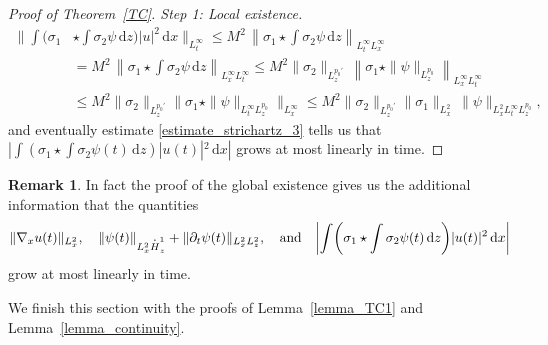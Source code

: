 \documentclass[11pt]{article}
\DeclareRobustCommand{\accentset}[2]{\overset{#1}{#2}}
\theoremstyle{definition}
\newtheorem{rmk}[lemma]{Remark}
\newcommand*{\overbigdot}[1]{%
\accentset{\mbox{\large\bfseries .}}{#1}}
\newenvironment{ProofOf}[1]{\begin{proof}[Proof of #1]}{\end{proof}}
\newcommand{\ud}{\, {\mathrm{d}}}
\begin{document}
\begin{ProofOf}{Theorem~\ref{TC}. Step 1: Local existence}
\begin{equation}
\begin{split}
\biggl\|\int(\sigma_{1}&\star\int\sigma_{2}\psi\ud z)|u|^{2}\ud x\biggr\|_{L_{t}^{\infty}}\leq M^{2}\,\left\|\sigma_{1}\star\int\sigma_{2}\psi\ud z\right\|_{L_{t}^{\infty}L_{x}^{\infty}}\\
&=M^{2}\,\left\|\sigma_{1}\star\int\sigma_{2}\psi\ud z\right\|_{L_{x}^{\infty}L_{t}^{\infty}}\leq M^{2}\|\sigma_{2}\|_{L_{z}^{p_{0}'}}\,\left\|\sigma_{1}\star\|\psi\|_{L_{z}^{p_{0}}}\right\|_{L_{x}^{\infty}L_{t}^{\infty}}\\
&\leq M^{2}\|\sigma_{2}\|_{L_{z}^{p_{0}'}}\bigl\|\sigma_{1}\star\|\psi\|_{L_{t}^{\infty}L_{z}^{p_{0}}}\bigr\|_{L_{x}^{\infty}}\leq M^{2}\|\sigma_{2}\|_{L_{z}^{p_{0}'}}\|\sigma_{1}\|_{L_{x}^{2}}\,\|\psi\|_{L_{x}^{2}L_{t}^{\infty}L_{z}^{p_{0}}},
\end{split}
\end{equation}
and eventually estimate \eqref{estimate_strichartz_3} tells us that $|\int(\sigma_{1}\star\int\sigma_{2}\psi(t)\ud z)|u(t)|^{2}\ud x|$ grows at most linearly in time.
\end{ProofOf}

\begin{rmk}
In fact the proof of the global existence gives us the additional information that the quantities
\[
\|\nabla_{x}u(t)\|_{L_{x}^{2}},\quad \|\psi(t)\|_{L_{x}^{2}\overbigdot{H}_{z}^{1}}+\|\partial_{t}\psi(t)\|_{L_{x}^{2}L_{z}^{2}},\quad\text{and}\quad
\biggl|\int\biggl(\sigma_{1}\star\int\sigma_{2}\psi(t)\ud z\biggr)|u(t)|^{2}\ud x\biggr|
\]
grow at most linearly in time.
\end{rmk}

We finish this section with the proofs of Lemma~\ref{lemma_TC1} and Lemma~\ref{lemma_continuity}.
\end{document}
